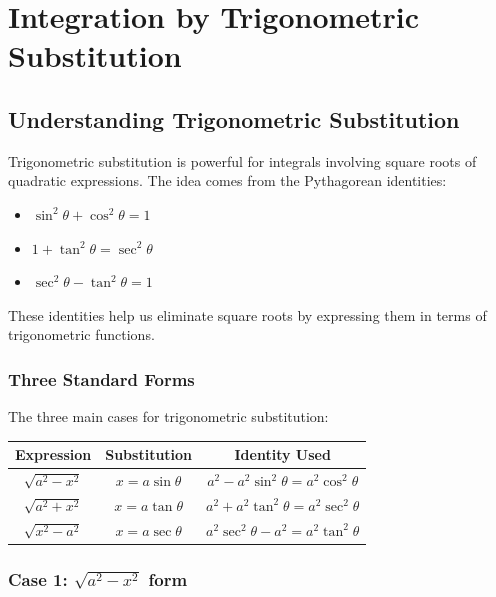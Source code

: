 \documentclass[12pt,a4paper]{book}
\theoremstyle{definition}
\begin{document}
\chapter{Integration by Trigonometric Substitution}

\section{Understanding Trigonometric Substitution}

\begin{intuition}
Trigonometric substitution is powerful for integrals involving square roots of quadratic expressions. The idea comes from the Pythagorean identities:
\begin{itemize}
    \item $\sin^2 \theta + \cos^2 \theta = 1$
    \item $1 + \tan^2 \theta = \sec^2 \theta$
    \item $\sec^2 \theta - \tan^2 \theta = 1$
\end{itemize}

These identities help us eliminate square roots by expressing them in terms of trigonometric functions.
\end{intuition}

\subsection{Three Standard Forms}

\begin{keyformula}
The three main cases for trigonometric substitution:

\begin{center}
\begin{tabular}{|c|c|c|}
\hline
\textbf{Expression} & \textbf{Substitution} & \textbf{Identity Used} \\
\hline
$\sqrt{a^2 - x^2}$ & $x = a\sin\theta$ & $a^2 - a^2\sin^2\theta = a^2\cos^2\theta$ \\
\hline
$\sqrt{a^2 + x^2}$ & $x = a\tan\theta$ & $a^2 + a^2\tan^2\theta = a^2\sec^2\theta$ \\
\hline
$\sqrt{x^2 - a^2}$ & $x = a\sec\theta$ & $a^2\sec^2\theta - a^2 = a^2\tan^2\theta$ \\
\hline
\end{tabular}
\end{center}
\end{keyformula}

\subsection{Case 1: $\sqrt{a^2 - x^2}$ form}
\end{document}

